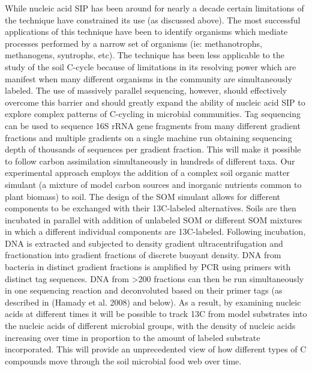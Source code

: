 While nucleic acid SIP has been around for nearly a decade certain limitations of the technique have constrained its use (as discussed above). The most successful applications of this technique have been to identify organisms which mediate processes performed by a narrow set of organisms (ie: methanotrophs, methanogens, syntrophs, etc). The technique has been less applicable to the study of the soil C-cycle because of limitations in its resolving power which are manifest when many different organisms in the community are simultaneously labeled. The use of massively parallel sequencing, however, should effectively overcome this barrier and should greatly expand the ability of nucleic acid SIP to explore complex patterns of C-cycling in microbial communities. Tag sequencing can be used to sequence 16S rRNA gene fragments from many different gradient fractions and multiple gradients on a single machine run obtaining sequencing depth of thousands of sequences per gradient fraction. This will make it possible to follow carbon assimilation simultaneously in hundreds of different taxa.
Our experimental approach employs the addition of a complex soil organic matter simulant (a mixture of model carbon sources and inorganic nutrients common to plant biomass) to soil. The design of the SOM simulant allows for different components to be exchanged with their 13C-labeled alternatives. Soils are then incubated in parallel with addition of unlabeled SOM or different SOM mixtures in which a different individual components are 13C-labeled. Following incubation, DNA is extracted and subjected to density gradient ultracentrifugation and fractionation into gradient fractions of discrete buoyant density. DNA from bacteria in distinct gradient fractions is amplified by PCR using primers with distinct tag sequences. DNA from >200 fractions can then be run simultaneously in one sequencing reaction and deconvoluted based on their primer tags (as described in (Hamady et al. 2008) and below). As a result, by examining nucleic acids at different times it will be possible to track 13C from model substrates into the nucleic acids of different microbial groups, with the density of nucleic acids increasing over time in proportion to the amount of labeled substrate incorporated. This will provide an unprecedented view of how different types of C compounds move through the soil microbial food web over time.


